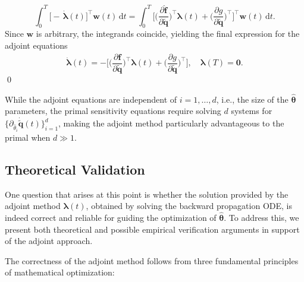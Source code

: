 $$\int_{0}^{T}
\bigl[
  -\,\dot{\bm{\lambda}}(t)
\bigr]^{\!\top}
\mathbf{w}(t)\,\mathrm{d}t
=
\int_{0}^{T}
\Biggl[
  \biggl(\dfrac{\partial\hat{\mathbf{f}}}{\partial\tilde{\mathbf{q}}}\biggr)^{\!\top}\bm{\lambda}(t)
  + \biggl(\dfrac{\partial g}{\partial\tilde{\mathbf{q}}}\biggr)^{\!\top}
\Biggr]^{\!\top}
\mathbf{w}(t)\,\mathrm{d}t.$$
Since $\mathbf{w}$ is arbitrary, the integrands coincide, yielding the final expression for the adjoint equations\\
$$\dot{\bm{\lambda}}(t)
= -\Biggl[
    \biggl(\dfrac{\partial\hat{\mathbf{f}}}{\partial\tilde{\mathbf{q}}}\biggr)^{\!\top}\bm{\lambda}(t)
    + \biggl(\dfrac{\partial g}{\partial\tilde{\mathbf{q}}}\biggr)^{\!\top}
  \Biggr],
\quad
\bm{\lambda}(T)=\bm{0}.$$
\qed

\begin{remark}  
 While the adjoint equations are independent of $i=1,\dots, d$, i.e., the size of the $\hat{\bm{\theta}}$ parameters, the primal sensitivity equations require solving $d$ systems for $\displaystyle\{\partial_{\hat{\theta}_i} \dot{\tilde{\mathbf{q}}}(t)\}_{i=1}^d$, making the adjoint method particularly advantageous to the primal when $d \gg 1$.
\end{remark}

\subsection*{Theoretical Validation}

One question that arises at this point is whether the solution provided by the adjoint method $\bm{\lambda}(t)$, obtained by solving the backward propagation ODE, is indeed correct and reliable for guiding the optimization of $\hat{\bm{\theta}}$. To address this, we present both theoretical and possible empirical verification arguments in support of the adjoint approach.

The correctness of the adjoint method follows from three fundamental principles of mathematical optimization:

